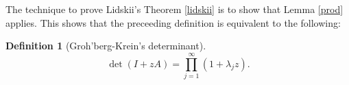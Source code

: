 \documentclass[a4paper]{article}
\theoremstyle{definition}
\newtheorem{definition}{Definition}[section]
\theoremstyle{remark}
\theoremstyle{remark}
\begin{document}
The technique to prove Lidskii's Theorem \ref{lidskii} is to show that Lemma \ref{prod} applies. This shows that the preceeding definition is equivalent to the following: 

\begin{definition}[Groh'berg-Krein's determinant]
    \begin{equation}
        \det (I + z A) = \prod_{j=1}^{\infty} (1 + \lambda_j z) . 
    \end{equation}
\end{definition}


\end{document}

